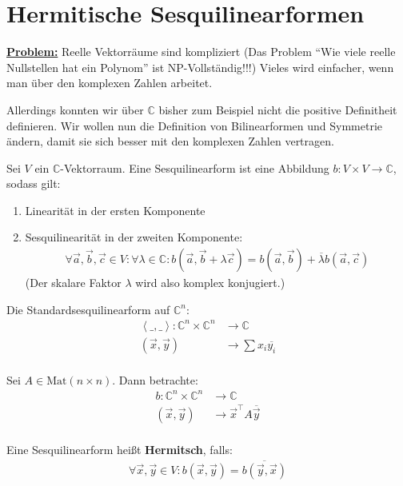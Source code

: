 \documentclass{report}
\newcommand*{\newpar}{\par\vspace{\baselineskip}\noindent}
\newcommand{\tbf}[1]{\textbf{#1}}
\newcommand{\ul}[1]{\underline{#1}}
\newcommand{\bC}{\mathbb{C}}
\newcommand{\vc}{\vec{c}}
\newcommand{\vx}{\vec{x}}
\newcommand{\vy}{\vec{y}}
\newcommand{\Matnn}{\text{Mat}(n \times n)}
\newcommand{\scalar}[2]{\left\langle #1, #2 \right\rangle}
\begin{document}
\section{Hermitische Sesquilinearformen}
\ul{\tbf{Problem:}} Reelle Vektorräume sind kompliziert (Das Problem ``Wie viele reelle Nullstellen hat ein Polynom'' ist NP-Vollständig!!!) Vieles wird einfacher, wenn man über den komplexen Zahlen arbeitet. 
\newpar
Allerdings konnten wir über $\bC$ bisher zum Beispiel nicht die positive Definitheit definieren. Wir wollen nun die Definition von Bilinearformen und Symmetrie ändern, damit sie sich besser mit den komplexen Zahlen vertragen.
\begin{definition}
 Sei $V$ ein $\bC$-Vektorraum. Eine Sesquilinearform ist eine Abbildung $b : V \times V \to \bC$, sodass gilt:
 \begin{enumerate}
  \item Linearität in der ersten Komponente
  \item Sesquilinearität in der zweiten Komponente:
  \begin{align*}
   \forall \vec{a}, \vec{b}, \vc \in V : \forall \lambda \in \bC : b(\vec{a}, \vec{b} + \lambda \vc) = b(\vec{a}, \vec{b}) + \overline{\lambda}b(\vec{a}, \vc)
  \end{align*}
  (Der skalare Faktor $\lambda$ wird also komplex konjugiert.)
 \end{enumerate}
\end{definition}
\begin{beispiel}
 Die Standardsesquilinearform auf $\bC^n$:
 \begin{align*}
  \scalar{\_}{\_}  : \bC^n \times \bC^n &\to \bC\\
  (\vx, \vy) &\to \sum x_i \overline{y_i}\\
 \end{align*}
\end{beispiel}
\begin{beispiel}
 Sei $A \in \Matnn$. Dann betrachte:
 \begin{align*}
  b : \bC^n \times \bC^n &\to \bC\\
  (\vx, \vy) &\to \vx^\top A \overline{\vy}\\
 \end{align*}
\end{beispiel}
\begin{definition}
 Eine Sesquilinearform heißt \tbf{Hermitsch}, falls:
 \begin{align*}
  \forall \vx, \vy \in V : b(\vx, \vy) = \overline{b(\vy, \vx)}
 \end{align*}
\end{definition}
\end{document}
